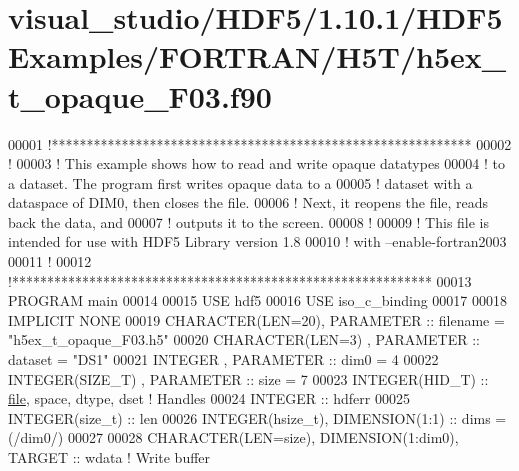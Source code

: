 \hypertarget{visual__studio_2_h_d_f5_21_810_81_2_h_d_f5_examples_2_f_o_r_t_r_a_n_2_h5_t_2h5ex__t__opaque___f03_8f90_source}{}\section{visual\+\_\+studio/\+H\+D\+F5/1.10.1/\+H\+D\+F5\+Examples/\+F\+O\+R\+T\+R\+A\+N/\+H5\+T/h5ex\+\_\+t\+\_\+opaque\+\_\+\+F03.f90}
\label{visual__studio_2_h_d_f5_21_810_81_2_h_d_f5_examples_2_f_o_r_t_r_a_n_2_h5_t_2h5ex__t__opaque___f03_8f90_source}

\begin{DoxyCode}
00001 \textcolor{comment}{!************************************************************}
00002 \textcolor{comment}{!}
00003 \textcolor{comment}{!  This example shows how to read and write opaque datatypes}
00004 \textcolor{comment}{!  to a dataset.  The program first writes opaque data to a}
00005 \textcolor{comment}{!  dataset with a dataspace of DIM0, then closes the file.}
00006 \textcolor{comment}{!  Next, it reopens the file, reads back the data, and}
00007 \textcolor{comment}{!  outputs it to the screen.}
00008 \textcolor{comment}{!}
00009 \textcolor{comment}{!  This file is intended for use with HDF5 Library version 1.8}
00010 \textcolor{comment}{!  with --enable-fortran2003}
00011 \textcolor{comment}{!}
00012 \textcolor{comment}{!************************************************************}
00013 \textcolor{keyword}{PROGRAM} main
00014 
00015   \textcolor{keywordtype}{USE }hdf5
00016   \textcolor{keywordtype}{USE }iso\_c\_binding
00017 
00018   \textcolor{keywordtype}{IMPLICIT NONE}
00019   \textcolor{keywordtype}{CHARACTER(LEN=20)}, \textcolor{keywordtype}{PARAMETER} :: filename  = \textcolor{stringliteral}{"h5ex\_t\_opaque\_F03.h5"}
00020   \textcolor{keywordtype}{CHARACTER(LEN=3)} , \textcolor{keywordtype}{PARAMETER} :: dataset   = \textcolor{stringliteral}{"DS1"}
00021   \textcolor{keywordtype}{INTEGER}          , \textcolor{keywordtype}{PARAMETER} :: dim0      = 4
00022   \textcolor{keywordtype}{INTEGER(SIZE\_T)}  , \textcolor{keywordtype}{PARAMETER} :: size      = 7
00023   \textcolor{keywordtype}{INTEGER(HID\_T)}  :: \hyperlink{structfile}{file}, space, dtype, dset \textcolor{comment}{! Handles}
00024   \textcolor{keywordtype}{INTEGER} :: hdferr
00025   \textcolor{keywordtype}{INTEGER(size\_t)} :: len
00026   \textcolor{keywordtype}{INTEGER(hsize\_t)},   \textcolor{keywordtype}{DIMENSION(1:1)} :: dims = (/dim0/)
00027 
00028   \textcolor{keywordtype}{CHARACTER(LEN=size)}, \textcolor{keywordtype}{DIMENSION(1:dim0)}, \textcolor{keywordtype}{TARGET} :: wdata \textcolor{comment}{! Write buffer}

\end{DoxyCode}
